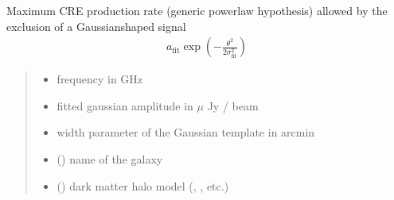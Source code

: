 \documentclass[letterpaper,10pt,english]{sphinxmanual}
\begin{document}
\begin{fulllineitems}
\label{\detokenize{diffsph:diffsph.limits.generic_rate_gausslim}}
\pysigstartsignatures
{}
\pysigstopsignatures
\sphinxAtStartPar
Maximum CRE production rate (generic power\sphinxhyphen{}law hypothesis) allowed by the exclusion of a Gaussian\sphinxhyphen{}shaped signal
\begin{equation*}
\begin{split}a_\text{fit}\exp\left(-\frac{\theta^2}{2\sigma_\text{fit}^2}\right)\end{split}
\end{equation*}\begin{quote}\begin{description}
\begin{itemize}
\item {} 
\sphinxAtStartPar
{} \textendash{} frequency in GHz

\item {} 
\sphinxAtStartPar
{} \textendash{} fitted gaussian amplitude in \(\mu\) Jy / beam

\item {} 
\sphinxAtStartPar
{} \textendash{} width parameter of the Gaussian template in arcmin

\item {} 
\sphinxAtStartPar
{} () \textendash{} name of the galaxy

\item {} 
\sphinxAtStartPar
{} () \textendash{} dark matter halo model (, , etc.)


\end{itemize}
\end{description}
\end{quote}
\end{fulllineitems}
\end{document}
